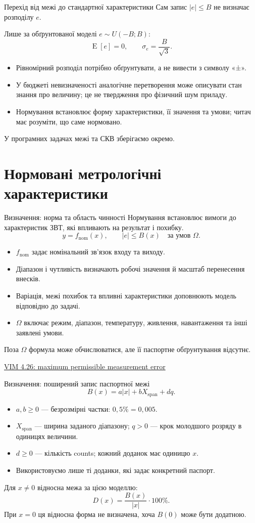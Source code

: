 \documentclass[aspectratio=169,11pt]{beamer}
\newcommand{\src}[2]{\par\vfill{\tiny\href{#1}{#2}}}
\newcommand{\E}{\operatorname{E}}
\begin{document}
\begin{frame}{Перехід від межі до стандартної характеристики}
Сам запис $|e|\le B$ не визначає розподілу $e$.
\medskip

Лише за обґрунтованої моделі $e\sim U(-B;B)$:
\[
\E[e]=0,\qquad \sigma_e=\frac{B}{\sqrt3}.
\]
\begin{itemize}
\item Рівномірний розподіл потрібно обґрунтувати, а не вивести з символу «±».
\item У бюджеті невизначеності аналогічне перетворення може описувати стан знання про величину; це не твердження про фізичний шум приладу.
\item Нормування встановлює форму характеристики, її значення та умови; читач має розуміти, що саме нормовано.
\end{itemize}
У програмних задачах межі та СКВ зберігаємо окремо.
\end{frame}

\section{Нормовані метрологічні характеристики}
\begin{frame}{Визначення: норма та область чинності}
Нормування встановлює вимоги до характеристик ЗВТ, які впливають на результат і похибку.
\[
y=f_{\mathrm{nom}}(x),\qquad |e|\le B(x)\quad\text{за умов }\Omega.
\]
\begin{itemize}
\item $f_{\mathrm{nom}}$ задає номінальний зв’язок входу та виходу.
\item Діапазон і чутливість визначають робочі значення й масштаб перенесення внесків.
\item Варіація, межі похибок та впливні характеристики доповнюють модель відповідно до задачі.
\item $\Omega$ включає режим, діапазон, температуру, живлення, навантаження та інші заявлені умови.
\end{itemize}
Поза $\Omega$ формула може обчислюватися, але її паспортне обґрунтування відсутнє.
\src{https://jcgm.bipm.org/vim/en/4.26.html}{VIM 4.26: maximum permissible measurement error}
\end{frame}

\begin{frame}{Визначення: поширений запис паспортної межі}
\[
B(x)=a|x|+bX_{\mathrm{span}}+d q.
\]
\begin{itemize}
\item $a,b\ge0$ — безрозмірні частки: $0{,}5\%=0{,}005$.
\item $X_{\mathrm{span}}$ — ширина заданого діапазону; $q>0$ — крок молодшого розряду в одиницях величини.
\item $d\ge0$ — кількість counts; кожний доданок має одиницю $x$.
\item Використовуємо лише ті доданки, які задає конкретний паспорт.
\end{itemize}
Для $x\ne0$ відносна межа за цією моделлю:
\[
D(x)=\frac{B(x)}{|x|}\cdot100\%.
\]
При $x=0$ ця відносна форма не визначена, хоча $B(0)$ може бути додатною.
\end{frame}
\end{document}
